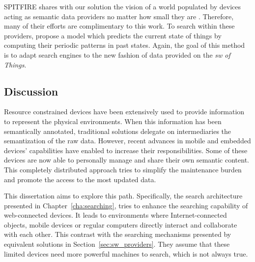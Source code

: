 SPITFIRE shares with our solution the vision of a world populated by devices acting as semantic data providers no matter how small they are \citep{hasemann_rdf_2012}.
Therefore, many of their efforts are complimentary to this work.
To search within these providers, \citet{pfisterer_spitfire_2011} propose a model which predicts the current state of things by computing their periodic patterns in past states.
Again, the goal of this method is to adapt search engines to the new fashion of data provided on the \emph{\acl{sw} of Things}.


\subsection{Discussion}

Resource constrained devices have been extensively used to provide information to represent the physical environments.
When this information has been semantically annotated, traditional solutions delegate on intermediaries the semantization of the raw data.
However, recent advances in mobile and embedded devices' capabilities have enabled to increase their responsibilities.
Some of these devices are now able to personally manage and share their own semantic content.
This completely distributed approach tries to simplify the maintenance burden and promote the access to the most updated data.


This dissertation aims to explore this path.
Specifically, the search architecture presented in Chapter~\ref{cha:searching}, tries to enhance the searching capability of web-connected devices.
It leads to environments where Internet-connected objects, mobile devices or regular computers directly interact and collaborate with each other. %
This contrast with the searching mechanisms presented by equivalent solutions in Section~\ref{sec:sw_providers}.
They assume that these limited devices need more powerful machines to search, which is not always true. %